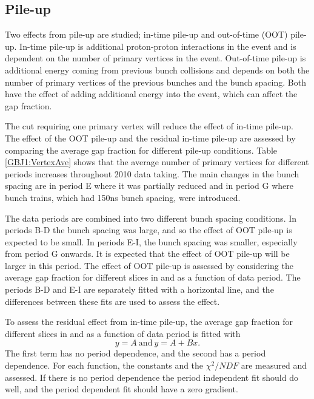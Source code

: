 
\subsection{Pile-up}
\label{sec:GBJ1:Pileup}



Two effects from pile-up are studied; in-time pile-up and out-of-time (OOT) pile-up.
In-time pile-up is additional proton-proton interactions in the event and is dependent on the number of primary vertices in the event.
Out-of-time pile-up is additional energy coming from previous bunch collisions and depends on both the number of primary vertices of the previous bunches and the bunch spacing. 
Both have the effect of adding additional energy into the event, which can affect the gap fraction.

The cut requiring one primary vertex will reduce the effect of in-time pile-up. 
The effect of the OOT pile-up and the residual in-time pile-up are assessed by comparing the average gap fraction for different pile-up conditions.
Table \ref{GBJ1:VertexAve} shows that the average number of primary vertices for different periods increases throughout 2010 data taking. 
The main changes in the bunch spacing are in period E where it was partially reduced and in period G where bunch trains, which had 150ns bunch spacing, were introduced.


The data periods are combined into two different bunch spacing conditions.
In periods B-D the bunch spacing was large, and so the effect of OOT pile-up is expected to be small.
In periods E-I, the bunch spacing was smaller, especially from period G onwards.
It is expected that the effect of OOT pile-up will be larger in this period.
The effect of OOT pile-up is assessed by considering the average gap fraction for different slices in \dy{} and \ptb{} as a function of data period.
The periods B-D and E-I are separately fitted with a horizontal line, and the differences between these fits are used to assess the effect. 

To assess the residual effect from in-time pile-up, the average gap fraction for different slices in \dy{} and \ptb{} as a function of data period is fitted with
\begin{equation}                              
y = A~\mathrm{and}~y = A + B x.
\label{GBJ1:Fit1}
\end{equation}
The first term has no period dependence, and the second has a period dependence.
For each function, the constants and the  $\chi^2/NDF$ are measured and assessed.
If there is no period dependence the period independent fit should do well, and the period dependent fit should have a zero gradient. 


